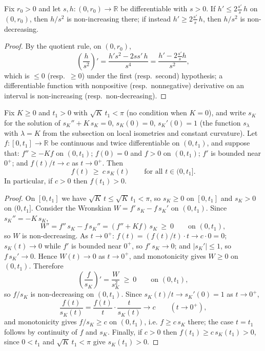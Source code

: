 \begin{lemma}
\label{lem:ratio-monotone}
\leanok


Fix $r_0>0$ and let $s,h\colon(0,r_0)\to\mathbb R$ be differentiable
with $s>0$. If $h'\le 2\frac{s'}{s}\,h$ on $(0,r_0)$, then $h/s^2$
is non-increasing there; if instead $h'\ge2\frac{s'}{s}\,h$, then
$h/s^2$ is non-decreasing.
\end{lemma}

\begin{proof}
\sketch
\leanok
By the quotient rule, on $(0,r_0)$,
$$\left(\frac{h}{s^2}\right)'
=\frac{h's^2-2ss'\,h}{s^4}
=\frac{h'-2\frac{s'}{s}h}{s^2},$$
which is $\le0$ (resp.\ $\ge0$) under the first (resp.\ second)
hypothesis; a differentiable function with nonpositive (resp.\
nonnegative) derivative on an interval is non-increasing (resp.\
non-decreasing).
\end{proof}

\begin{lemma}
\label{lem:scalar-sturm-comparison}
\leanok


Fix $K\ge0$ and $t_1>0$ with $\sqrt K\,t_1<\pi$ (no condition when
$K=0$), and write $s_K$ for the solution of $s_K''+K\,s_K=0$,
$s_K(0)=0$, $s_K'(0)=1$ (the function $s_\lambda$ with $\lambda=K$
from the subsection on local isometries and constant curvature).
Let $f\colon[0,t_1]\to\mathbb{R}$ be continuous and twice
differentiable on $(0,t_1)$, and suppose that: $f''\ge -K f$ on
$(0,t_1)$; $f(0)=0$ and $f>0$ on $(0,t_1)$; $f'$ is bounded near
$0^+$; and $f(t)/t\to c$ as $t\to0^+$. Then
$$f(t)\ \ge\ c\,s_K(t)\qquad\text{for all }t\in(0,t_1].$$
In particular, if $c>0$ then $f(t_1)>0$.
\end{lemma}

\begin{proof}
\sketch
\leanok
On $[0,t_1]$ we have $\sqrt K\,t\le\sqrt K\,t_1<\pi$, so $s_K\ge0$
on $[0,t_1]$ and $s_K>0$ on $(0,t_1]$. Consider the Wronskian
$W=f'\,s_K-f\,s_K'$ on $(0,t_1)$. Since $s_K''=-K\,s_K$,
$$W'=f''\,s_K-f\,s_K''=(f''+K f)\,s_K\ \ge\ 0\qquad
\text{on }(0,t_1),$$
so $W$ is non-decreasing. As $t\to0^+$: $f(t)=(f(t)/t)\cdot t\to
c\cdot0=0$; $s_K(t)\to0$ while $f'$ is bounded near $0^+$, so
$f'\,s_K\to0$; and $|s_K'|\le1$, so $f\,s_K'\to0$. Hence
$W(t)\to0$ as $t\to0^+$, and monotonicity gives $W\ge0$ on
$(0,t_1)$. Therefore
$$\left(\frac f{s_K}\right)'=\frac W{s_K^2}\ \ge\ 0
\qquad\text{on }(0,t_1),$$
so $f/s_K$ is non-decreasing on $(0,t_1)$. Since
$s_K(t)/t\to s_K'(0)=1$ as $t\to0^+$,
$$\frac{f(t)}{s_K(t)}=\frac{f(t)}{t}\cdot\frac{t}{s_K(t)}
\longrightarrow c\qquad(t\to0^+),$$
and monotonicity gives $f/s_K\ge c$ on $(0,t_1)$, i.e.
$f\ge c\,s_K$ there; the case $t=t_1$ follows by continuity of $f$
and $s_K$. Finally, if $c>0$ then
$f(t_1)\ge c\,s_K(t_1)>0$, since $0<t_1$ and $\sqrt K\,t_1<\pi$
give $s_K(t_1)>0$.
\end{proof}

